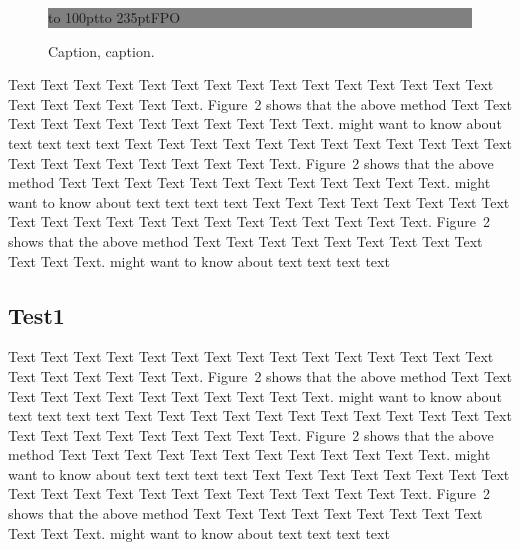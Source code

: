 \documentclass{bioinfo}
\begin{document}
\begin{figure}[!tpb]%
\fboxsep=0pt\colorbox{gray}{\begin{minipage}[t]{235pt} \vbox to 100pt{\vfill\hbox to
235pt{\hfill\fontsize{24pt}{24pt}\selectfont FPO\hfill}\vfill}
\end{minipage}}
\caption{Caption, caption.}\label{fig:01}
\end{figure}


Text Text Text Text Text Text  Text Text Text Text Text Text Text
Text Text  Text Text Text Text Text Text.
Figure~2\vphantom{\ref{fig:02}} shows that the above method  Text
Text Text Text  Text Text Text Text Text Text  Text Text.
\citealp{Boffelli03} might want to know about  text text text text
Text Text Text Text Text Text  Text Text Text Text Text Text Text
Text Text  Text Text Text Text Text Text.
Figure~2\vphantom{\ref{fig:02}} shows that the above method  Text
Text Text Text  Text Text Text Text Text Text  Text Text.
\citealp{Boffelli03} might want to know about  text text text text
Text Text Text Text Text Text Text Text Text Text Text Text Text
Text Text  Text Text Text Text Text Text.
Figure~2\vphantom{\ref{fig:02}} shows that the above method  Text
Text Text Text  Text Text Text Text Text Text  Text Text.
\citealp{Boffelli03} might want to know about  text text text text


\subsection{Test1}

Text Text Text Text Text Text  Text Text Text Text Text Text Text
Text Text  Text Text Text Text Text Text.
Figure~2\vphantom{\ref{fig:02}} shows that the above method  Text
Text Text Text  Text Text Text Text Text Text  Text Text.
\citealp{Boffelli03} might want to know about  text text text text
Text Text Text Text Text Text  Text Text Text Text Text Text Text
Text Text  Text Text Text Text Text Text.
Figure~2\vphantom{\ref{fig:02}} shows that the above method  Text
Text Text Text  Text Text Text Text Text Text  Text Text.
\citealp{Boffelli03} might want to know about  text text text text
Text Text Text Text Text Text Text Text Text Text Text Text Text
Text Text  Text Text Text Text Text Text.
Figure~2\vphantom{\ref{fig:02}} shows that the above method  Text
Text Text Text  Text Text Text Text Text Text  Text Text.
\citealp{Boffelli03} might want to know about  text text text text
\end{document}
